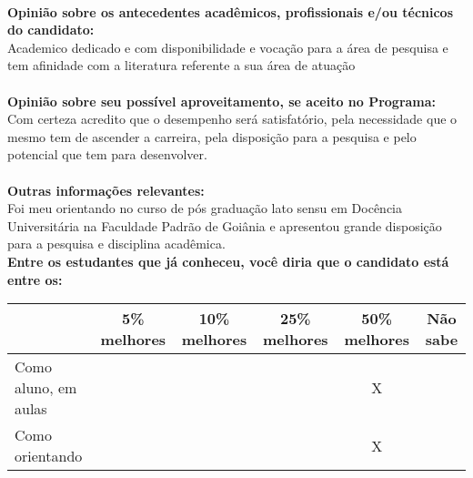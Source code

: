 \documentclass[11pt]{article}
\begin{document}
\\
\textbf{Opinião sobre os antecedentes acadêmicos, profissionais e/ou técnicos do candidato:}
\\Academico dedicado e com disponibilidade e vocação para a área de pesquisa e tem afinidade com a literatura referente a sua área de atuação\\
\\
\textbf{Opinião sobre seu possível aproveitamento, se aceito no Programa:}
\\Com certeza acredito que o desempenho será satisfatório, pela necessidade que o mesmo tem de ascender a carreira, pela disposição para a pesquisa e pelo potencial que tem para desenvolver.\\ 
\\
\textbf{Outras informações relevantes:} \\Foi meu orientando no curso de pós graduação lato sensu em Docência Universitária na Faculdade Padrão de Goiânia e apresentou grande disposição para a pesquisa e disciplina acadêmica.
\\[0.3cm]
\textbf{Entre os estudantes que já conheceu, você diria que o candidato está entre os:}
\\
\begin{tabular}{|l|c|c|c|c|c|}
\hline
 & 5\% melhores & 10\% melhores & 25\% melhores & 50\% melhores & Não sabe \\
\hline
Como aluno, em aulas &  &  &  & X & \\
\hline
Como orientando &  &  &  & X & \\
\hline
\end{tabular}
\end{document}
